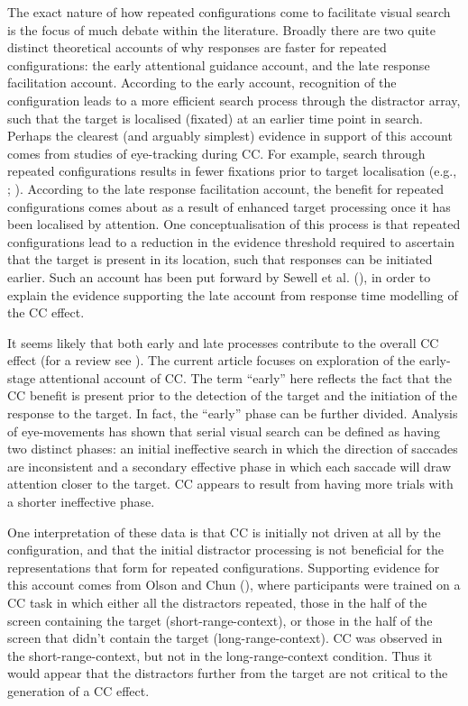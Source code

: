 \documentclass[
  man,
  floatsintext,
  longtable,
  nolmodern,
  notxfonts,
  notimes,
  colorlinks=true,linkcolor=blue,citecolor=blue,urlcolor=blue]{apa7}
\begin{document}
The exact nature of how repeated configurations come to facilitate
visual search is the focus of much debate within the literature. Broadly
there are two quite distinct theoretical accounts of why responses are
faster for repeated configurations: the early attentional guidance
account, and the late response facilitation account. According to the
early account, recognition of the configuration leads to a more
efficient search process through the distractor array, such that the
target is localised (fixated) at an earlier time point in search.
Perhaps the clearest (and arguably simplest) evidence in support of this
account comes from studies of eye-tracking during CC. For example,
search through repeated configurations results in fewer fixations prior
to target localisation (e.g., ; ). According to the
late response facilitation account, the benefit for repeated
configurations comes about as a result of enhanced target processing
once it has been localised by attention. One conceptualisation of this
process is that repeated configurations lead to a reduction in the
evidence threshold required to ascertain that the target is present in
its location, such that responses can be initiated earlier. Such an
account has been put forward by Sewell et al.
(), in order to explain the evidence
supporting the late account from response time modelling of the CC
effect.

It seems likely that both early and late processes contribute to the
overall CC effect (for a review see ). The current article focuses on exploration of the early-stage
attentional account of CC. The term ``early'' here reflects the fact
that the CC benefit is present prior to the detection of the target and
the initiation of the response to the target. In fact, the ``early''
phase can be further divided. Analysis of eye-movements has shown that
serial visual search can be defined as having two distinct phases: an
initial ineffective search in which the direction of saccades are
inconsistent and a secondary effective phase in which each saccade will
draw attention closer to the target. CC appears to result from having
more trials with a shorter ineffective phase.

One interpretation of these data is that CC is initially not driven at
all by the configuration, and that the initial distractor processing is
not beneficial for the representations that form for repeated
configurations. Supporting evidence for this account comes from Olson
and Chun (), where participants were
trained on a CC task in which either all the distractors repeated, those
in the half of the screen containing the target (short-range-context),
or those in the half of the screen that didn't contain the target
(long-range-context). CC was observed in the short-range-context, but
not in the long-range-context condition. Thus it would appear that the
distractors further from the target are not critical to the generation
of a CC effect.
\end{document}
